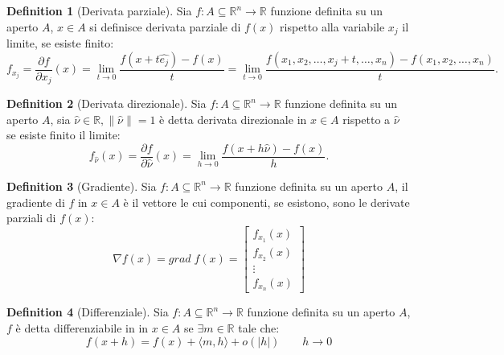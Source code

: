 \documentclass[leqno]{article}
\theoremstyle{definition}
\newtheorem{definition}{Definition}[section]
\numberwithin{equation}{section}
\theoremstyle{remark}
\begin{document}
	\begin{definition}[Derivata parziale]
		Sia $f:A\subseteq \mathbb{R}^n \rightarrow \mathbb{R}$ funzione definita su un aperto $A$, $ {x} \in A$ si definisce derivata parziale di $f(x)$ rispetto alla variabile $x_j$ il limite, se esiste finito: 
		\begin{equation}
			f_{x_j}={\frac {\partial f}{\partial x_{j}}}(x)=\lim _{t\to 0}{\frac {f(  {x} +t  \hat{e_{j}})-f(  {x} )}{t}}=\lim _{t\to 0}{\frac {f(x_{1},x_{2},\dots, x_{j}+t,\dots ,x_{n})-f(x_{1},x_{2},\dots ,x_{n})}{t}}.
		\end{equation}
	\end{definition}
	\begin{definition}[Derivata direzionale]
		Sia $f:A\subseteq \mathbb{R}^n \rightarrow \mathbb{R}$ funzione definita su un aperto $A$, sia $\hat{\nu} \in \mathbb{R}, \lVert \hat{\nu} \rVert = 1$ è detta derivata direzionale in $ {x} \in A$ rispetto a $\hat{\nu}$ se esiste finito il limite:
		\begin{equation}
			f_{\hat{\nu}}(x)={\frac {\partial f}{\partial \hat{\nu}}(  {x} )=\lim _{h\rightarrow 0}{\frac {f( x +h  \hat{\nu} )-f( {x} )}{h}}.}
		\end{equation}
	\end{definition}
	\begin{definition}[Gradiente]
		Sia $f:A\subseteq \mathbb{R}^n \rightarrow \mathbb{R}$ funzione definita su un aperto $A$, il gradiente di $f$ in $ {x} \in A$ è il vettore le cui componenti, se esistono, sono le derivate parziali di $f(x)$:
		\begin{equation}
			\nabla f(x) = grad \; f(x) = \begin{bmatrix}
				f_{x_1}(x)\\ f_{x_2}(x)\\\vdots \\f_{x_n}(x)
			\end{bmatrix}
		\end{equation}
	\end{definition}
	\begin{definition}[Differenziale]
		Sia $f:A\subseteq \mathbb{R}^n \rightarrow \mathbb{R}$ funzione definita su un aperto $A$, $f$ è detta differenziabile in in $ {x} \in A$ se $\exists m \in \mathbb{R}$ tale che: 
		\begin{equation}
			f(x+h)=f(x)+\langle m , h \rangle + o(|h|) \quad \quad h\rightarrow 0
		\end{equation}
	\end{definition}
	
\end{document}
